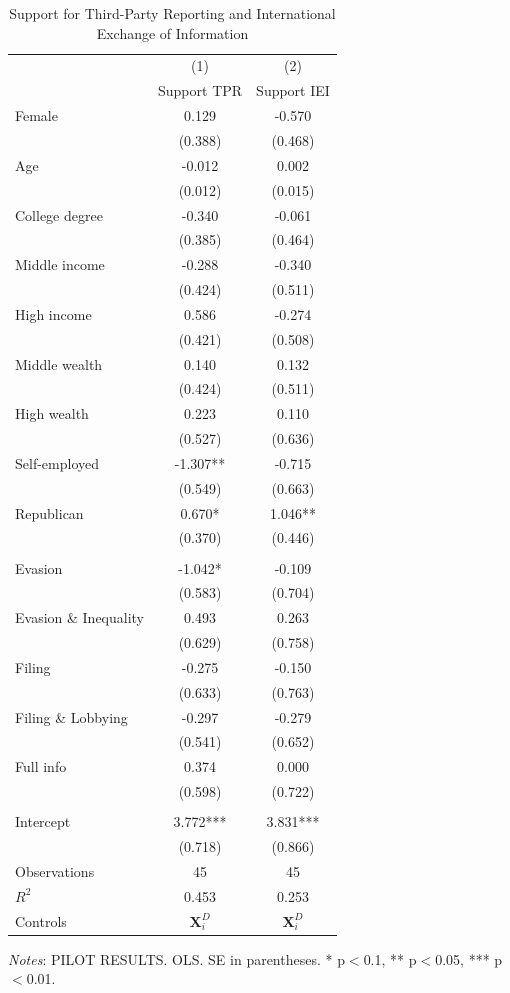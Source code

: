 \documentclass[11pt]{article}
\begin{document}
\FloatBarrier
\begin{table}[!htbp]\centering
\caption{Support for Third-Party Reporting and International Exchange of Information}
\label{tab:supportTPRIEI_c}
\begin{threeparttable}
\footnotesize
\begin{tabular}{l|cc}
\toprule
& (1) & (2) \\
& Support TPR & Support IEI \\
\midrule
Female & 0.129 & -0.570 \\
 & (0.388) & (0.468) \\
Age & -0.012 & 0.002 \\
 & (0.012) & (0.015) \\
College degree & -0.340 & -0.061 \\
 & (0.385) & (0.464) \\
Middle income & -0.288 & -0.340 \\
 & (0.424) & (0.511) \\
High income & 0.586 & -0.274 \\
 & (0.421) & (0.508) \\
Middle wealth & 0.140 & 0.132 \\
 & (0.424) & (0.511) \\
High wealth & 0.223 & 0.110 \\
 & (0.527) & (0.636) \\
Self-employed & -1.307** & -0.715 \\
 & (0.549) & (0.663) \\
Republican & 0.670* & 1.046** \\
 & (0.370) & (0.446) \\
\\[0.5em]
Evasion & -1.042* & -0.109 \\
 & (0.583) & (0.704) \\
Evasion \& Inequality & 0.493 & 0.263 \\
 & (0.629) & (0.758) \\
Filing & -0.275 & -0.150 \\
 & (0.633) & (0.763) \\
Filing \& Lobbying & -0.297 & -0.279 \\
 & (0.541) & (0.652) \\
Full info & 0.374 & 0.000 \\
 & (0.598) & (0.722) \\
\\[0.5em]
Intercept & 3.772*** & 3.831*** \\
 & (0.718) & (0.866) \\
\midrule
Observations & 45 & 45 \\
$R^2$ & 0.453 & 0.253 \\
Controls & $\mathbf{X}_{i}^{D}$ & $\mathbf{X}_{i}^{D}$ \\
\bottomrule
\end{tabular}
\begin{tablenotes}[flushleft]
\footnotesize
\item \textit{Notes}: PILOT RESULTS. OLS. SE in parentheses. * p$<$0.1, ** p$<$0.05, *** p$<$0.01.
\end{tablenotes}
\end{threeparttable}
\end{table}
\end{document}

